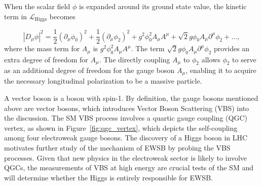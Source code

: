 \label{section:Vector_Boson_Scattering}

When the scalar field \( \phi \) is expanded around its ground state value, the kinetic term in $\mathcal{L}_\text{Higgs}$ becomes

\begin{equation}
|D_\mu \phi|^2 = \frac{1}{2} (\partial_\mu \phi_0)^2 + \frac{1}{2} (\partial_\mu \phi_2)^2 
+ g^2 \phi_0^2 A_\mu A^\mu + \sqrt{2} g \phi_0 A_\mu \partial^\mu \phi_2 + \ldots,
\end{equation}
where the mass term for \( A_\mu \) is \( g^2 \phi_0^2 A_\mu A^\mu \). The term \( \sqrt{2} g \phi_0 A_\mu \partial^\mu \phi_2 \) provides an extra degree of freedom for \( A_\mu \). The directly coupling \( A_\mu \) to \( \phi_2 \) allows \( \phi_2 \) to serve as an additional degree of freedom for the gauge boson \( A_\mu \), enabling it to acquire the necessary longitudinal polarization to be a massive particle.

A vector boson is a boson with spin-1. By definition, the gauge bosons mentioned above are vector bosons, which introduces Vector Boson Scattering (VBS) into the discussion. 
The SM VBS process involves a quartic gauge coupling (QGC) vertex, as shown in Figure~\ref{fig:qgc_vertex}, which depicts the self-coupling among four electroweak gauge bosons.
The discovery of a Higgs boson in LHC~\cite{20121, 201230} motivates further study of the mechanism of EWSB by probing the VBS processes.
Given that new physics in the electroweak sector is likely to involve QGCs,
the measurements of VBS at high energy are crucial tests of the SM and will determine whether the Higgs is entirely responsible for EWSB.

